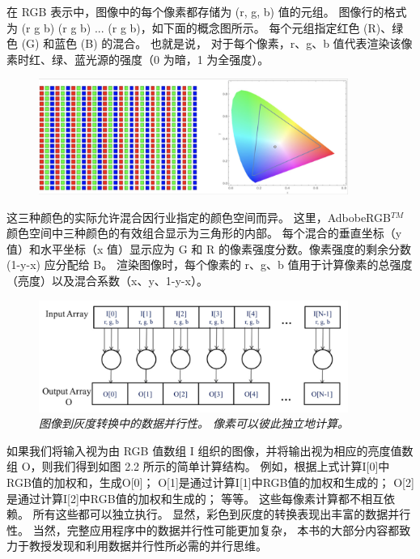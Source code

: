 \begin{remark}
在 RGB 表示中，图像中的每个像素都存储为 (r, g, b) 值的元组。 
图像行的格式为 (r g b) (r g b) ... (r g b)，如下面的概念图所示。 
每个元组指定红色 (R)、绿色 (G) 和蓝色 (B) 的混合。 也就是说，
对于每个像素，r、g、b 值代表渲染该像素时红、绿、蓝光源的强度（0 为暗，1 为全强度）。
\begin{figure}[H]
	\centering
	\includegraphics[width=0.9\textwidth]{figs/F2-a1.png}
\end{figure}

这三种颜色的实际允许混合因行业指定的颜色空间而异。 
这里，AdbobeRGB$^{TM}$ 颜色空间中三种颜色的有效组合显示为三角形的内部。 
每个混合的垂直坐标（y 值）和水平坐标（x 值）显示应为 G 和 R 的像素强度分数。像素强度的剩余分数 (1-y-x) 应分配给 B。 
渲染图像时，每个像素的 r、g、b 值用于计算像素的总强度（亮度）以及混合系数（x、y、1-y-x）。
\end{remark}

\begin{figure}[H]
	\centering
	\includegraphics[width=0.9\textwidth]{figs/F2.2.png}
	\caption{\textit{图像到灰度转换中的数据并行性。 像素可以彼此独立地计算。}}
\end{figure}

如果我们将输入视为由 RGB 值数组 I 组织的图像，并将输出视为相应的亮度值数组 O，则我们得到如图 2.2 所示的简单计算结构。 
例如，根据上式计算I[0]中RGB值的加权和，生成O[0]； O[1]是通过计算I[1]中RGB值的加权和生成的； 
O[2]是通过计算I[2]中RGB值的加权和生成的； 等等。 这些每像素计算都不相互依赖。 所有这些都可以独立执行。 
显然，彩色到灰度的转换表现出丰富的数据并行性。 当然，完整应用程序中的数据并行性可能更加复杂，
本书的大部分内容都致力于教授发现和利用数据并行性所必需的并行思维。

